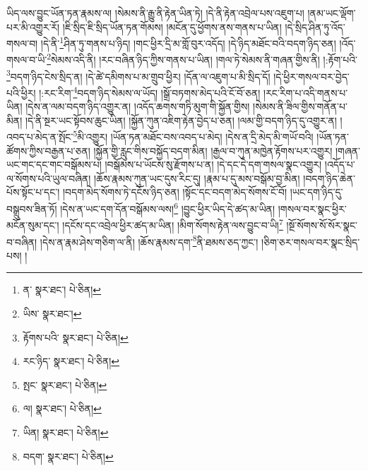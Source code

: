 ཡིད་ལས་བྱུང་ཡོན་ཏན་རྣམས་ལ། །སེམས་ནི་རྒྱུ་ནི་རྟེན་ཡིན་ཏེ། །དེ་ནི་རྟེན་འབྲེལ་པས་འཇུག་པ། །ནམ་ཡང་ལྡོག་པར་མི་འགྱུར་རོ། །ཇི་སྲིད་ཇི་སྲིད་ཡོན་ཏན་གོམས། །མངོན་དུ་ཕྱོགས་ནས་གནས་པ་ཡིན། །དེ་སྲིད་ཤིན་ཏུ་འོད་གསལ་བ། །དེ་ནི་\footnote{ན་  སྣར་ཐང་།  པེ་ཅིན། }ཤིན་ཏུ་གནས་པ་ཉིད། །གང་ཕྱིར་དྲི་མ་གློ་བུར་འདོད། །དེ་ཉིད་མཐོང་བའི་བདག་ཉིད་ཅན། །འོད་གསལ་བ་ཡི་\footnote{ཡིས་  སྣར་ཐང་། }སེམས་འདི་ནི། །རང་བཞིན་ཉིད་ཀྱིས་གནས་པ་ཡིན། །གལ་ཏེ་སེམས་ནི་གཞན་གྱིས་ནི། །:རྟོག་པའི་\footnote{རྟོགས་པའི་  སྣར་ཐང་།  པེ་ཅིན། }བདག་ཉིད་ངེས་སྲིད་ན། །དེ་ཚེ་དམིགས་པ་མ་གྲུབ་ཕྱིར། །དོན་ལ་འཇུག་པ་མི་སྲིད་དོ། །དེ་ཕྱིར་གསལ་བར་བྱེད་པའི་ཕྱིར། །:རང་རིག་\footnote{རང་ཉིད་  སྣར་ཐང་།  པེ་ཅིན། }བདག་ཉིད་སེམས་ལ་ཡོད། །སྒྲོ་བཏགས་མེད་པའི་ངོ་བོ་ཅན། །རང་རིག་པ་འདི་གནས་པ་ཡིན། །དེས་ན་ལམ་བདག་ཉིད་འགྱུར་ན། །འདོད་ཆགས་གཏི་མུག་གི་སྐྱོན་གྱིས། །སེམས་ནི་ཟིལ་གྱིས་གནོན་པ་མིན། །དེ་ནི་སྔར་ཡང་སྟོབས་ཆུང་ཡིན། །སྐྱོན་ཀུན་འཇིག་རྟེན་བྱེད་པ་ཅན། །ལམ་གྱི་བདག་ཉིད་དུ་འགྱུར་ན། །འབད་པ་མེད་ན་སྤོང་\footnote{སྤང་  སྣར་ཐང་།  པེ་ཅིན། }མི་འགྱུར། །ཡོན་ཏན་མཐོང་བས་འབད་པ་མེད། །དེས་ན་དྲི་མེད་མི་གཡོ་བའི། །ཡོན་ཏན་ཚོགས་ཀྱིས་བརྒྱན་པ་ཅན། །སྐྱོན་གྱི་རླུང་གིས་བསྐྱོད་བདག་མིན། །རྒྱལ་བ་ཀུན་མཁྱེན་རྟོགས་པར་འགྱུར། །གཞན་ཡང་གང་དང་གང་བསྒོམས་པ། །བསྒོམས་པ་ཡོངས་སུ་རྫོགས་པ་ན། །དེ་དང་དེ་དག་གསལ་སྣང་འགྱུར། །འདོད་པ་ལ་སོགས་པའི་ཡུལ་བཞིན། །ཆོས་རྣམས་ཀུན་ཡང་དུས་རིང་དུ། །རྣམ་པ་དུ་མས་བསྒོམ་བྱ་མིན། །བདག་ཉིད་ཆེན་པོས་སྟོང་པ་དང་། །བདག་མེད་སོགས་ཏེ་དངོས་ཉིད་ཅན། །སྟོང་དང་བདག་མེད་སོགས་ངོ་བོ། །ཡང་དག་ཉིད་དུ་བསྒྲུབས་ཟིན་ཏོ། །དེས་ན་ཡང་དག་དོན་བསྒོམས་ལས།\footnote{ལ།  སྣར་ཐང་།  པེ་ཅིན། } །བྱུང་ཕྱིར་ཡིད་དེ་ཚད་མ་ཡིན། །གསལ་བར་སྣང་ཕྱིར་མངོན་སུམ་དང་། །དངོས་དང་འབྲེལ་ཕྱིར་ཚད་མ་ཡིན། །མིག་སོགས་རྟེན་ལས་བྱུང་བ་ཡི།\footnote{ཡིན།  སྣར་ཐང་།  པེ་ཅིན། } །སྔོ་སོགས་སོ་སོར་སྣང་བ་བཞིན། །དེས་ན་རྣམ་ཤེས་གཅིག་ལ་ནི། །ཆོས་རྣམས་དག་\footnote{བདག་  སྣར་ཐང་།  པེ་ཅིན། }ནི་ཐམས་ཅད་ཀྱང་། །ཅིག་ཅར་གསལ་བར་སྣང་སྲིད་པས། །
